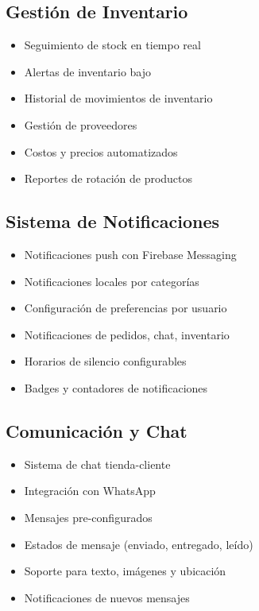 \documentclass[12pt,a4paper]{article}
\begin{document}
\subsection{Gestión de Inventario}
\begin{itemize}[itemsep=0.5em]
    \item Seguimiento de stock en tiempo real
    \item Alertas de inventario bajo
    \item Historial de movimientos de inventario
    \item Gestión de proveedores
    \item Costos y precios automatizados
    \item Reportes de rotación de productos
\end{itemize}

\subsection{Sistema de Notificaciones}
\begin{itemize}[itemsep=0.5em]
    \item Notificaciones push con Firebase Messaging
    \item Notificaciones locales por categorías
    \item Configuración de preferencias por usuario
    \item Notificaciones de pedidos, chat, inventario
    \item Horarios de silencio configurables
    \item Badges y contadores de notificaciones
\end{itemize}

\subsection{Comunicación y Chat}
\begin{itemize}[itemsep=0.5em]
    \item Sistema de chat tienda-cliente
    \item Integración con WhatsApp
    \item Mensajes pre-configurados
    \item Estados de mensaje (enviado, entregado, leído)
    \item Soporte para texto, imágenes y ubicación
    \item Notificaciones de nuevos mensajes
\end{itemize}
\end{document}
